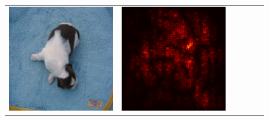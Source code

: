 \documentclass[preprint,12pt]{elsarticle}
\begin{document}
\begin{figure}[p]
\begin{tabular}{cccccc}
  \includegraphics[scale=\scale]{../visualizations/examples/imagenette/cnn/images/3.png} &
  \includegraphics[scale=\scale]{../visualizations/examples/imagenette/cnn/saliency_map/3.png} & 

\end{tabular}
\end{figure}
\end{document}
